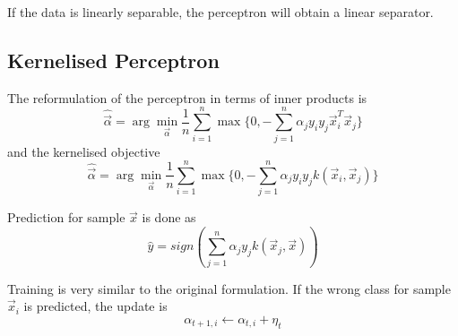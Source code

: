 \begin{theorem}
    If the data is linearly separable, the perceptron will obtain
    a linear separator.
\end{theorem}


\subsection{Kernelised Perceptron}
The reformulation of the perceptron in terms of inner
products is
\begin{equation*}
    \hat{\vec{\alpha}} = \arg\min_{\vec{\alpha}}{
        \frac{1}{n}
        \sum_{i=1}^n{\max\{
            0, -\sum_{j=1}^n{\alpha_j y_i y_j \vec{x}_i^T \vec{x}_j}
        \}}
    }
\end{equation*}
and the kernelised objective
\begin{equation*}
    \hat{\vec{\alpha}} = \arg\min_{\vec{\alpha}}{
        \frac{1}{n}
        \sum_{i=1}^n{\max\{
            0, -\sum_{j=1}^n{\alpha_j y_i y_j k(\vec{x}_i, \vec{x}_j)}
        \}}
    }
\end{equation*}

Prediction for sample $\vec{x}$ is done as
\begin{equation*}
    \hat{y} = sign\left(
        \sum_{j=1}^n{\alpha_j y_j k(\vec{x}_j, \vec{x})}
    \right)
\end{equation*}

Training is very similar to the original formulation.
If the wrong class for sample $\vec{x}_i$ is predicted,
the update is
\begin{equation*}
    \alpha_{t+1, i} \gets \alpha_{t, i} + \eta_t
\end{equation*}
